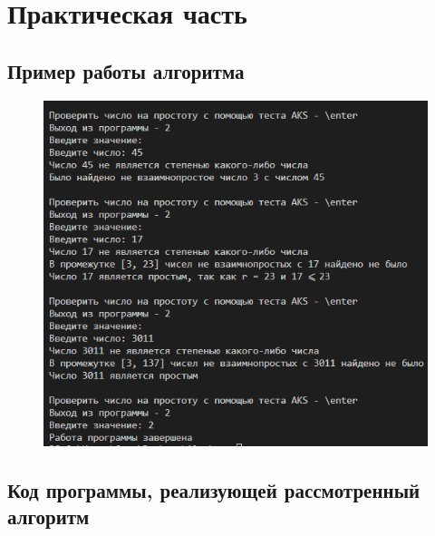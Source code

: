 \documentclass[bachelor, och, labwork]{shiza}
\begin{document}
\section{Практическая часть}
\subsection{Пример работы алгоритма}
\begin{figure}[H]
    \centering
    \includegraphics[width=1\textwidth]{pic1.png}
    \caption{}
\end{figure}

    \subsection{Код программы, реализующей рассмотренный алгоритм}
        \inputminted{python}{lab8.py}
\end{document}
